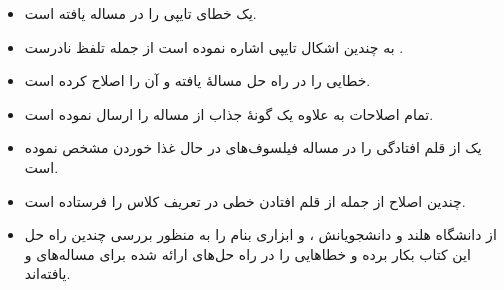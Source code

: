 \documentclass{book}
\begin{document}
\begin{itemize}
    


\item {}
    یک خطای تایپی را در مساله  یافته است. 


\item {}
    به چندین اشکال تایپی اشاره نموده است از جمله تلفظ نادرست .

\item {}
    خطایی را در راه حل مسالهٔ  یافته و آن را اصلاح کرده است. 


\item {}
    تمام اصلاحات به علاوه یک گونهٔ جذاب از مساله  را ارسال نموده است. 
    
    

\item {} 
    یک از قلم افتادگی را در مساله فیلسوف‌های در حال غذا خوردن مشخص نموده است.
    

\item {}
    چندین اصلاح از جمله از قلم افتادن خطی در تعریف کلاس  را فرستاده است. 

\item {}
    از دانشگاه  هلند و دانشجویانش 
    ،  و 
    ابزاری بنام  را به منظور بررسی چندین راه حل این کتاب بکار برده و خطاهایی را در راه حل‌های ارائه شده برای 
    مساله‌های  و   یافته‌اند. 
    



\end{itemize}
\end{document}
